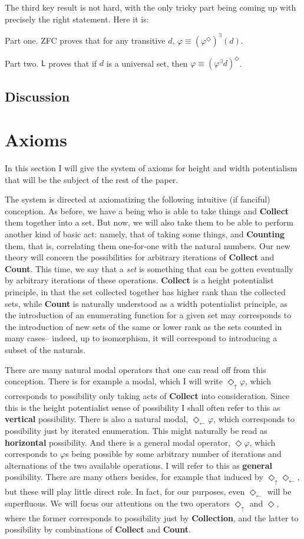 \documentclass{article}
\newcommand{\du}{\Diamond_\uparrow}
\newcommand{\dl}{\Diamond_\leftarrow}
\begin{document}
The third key result is not hard, with the only tricky part being coming up with precisely 
the right statement. Here it is:

Part one. ZFC proves that for any transitive $d$, 
$\varphi \equiv (\varphi^\Diamond)^\exists(d)$.

Part two. $\mathsf{L}$ proves that if $d$ is a universal set,
then $\varphi \equiv (\varphi^\exists d)^\Diamond$.


\subsection{Discussion}
\section{Axioms}
In this section I will give the system of axioms for height and width potentialism 
that will be the subject of the rest of the paper.

The system is directed at axiomatizing the following intuitive (if fanciful) conception.
As before, we have a being who is able to take things and {\bf Collect} them together into a set.
But now, we will also take them to be able to perform another kind of basic act: namely, 
that of taking some things, and {\bf Counting} them, that is, correlating them one-for-one
with the natural numbers. Our new theory will concern the possibilities for arbitrary iterations 
of {\bf Collect} and {\bf Count}. This time, we say that a \emph{set} is something that can be 
gotten eventually by arbitrary iterations of these operations. {\bf Collect} is a height potentialist 
principle, in that the set collected together has higher rank than the collected sets, 
while {\bf Count} is naturally understood as a width potentialist principle, 
as the introduction of an enumerating function for a given set may corresponds to the introduction 
of new sets of the same or lower rank as the sets counted in many cases--
indeed, up to isomorphism, it will correspond to introducing a subset of the naturals.

There are many natural modal operators that one can read off from this conception. 
There is for example a modal, which I will write $\du \varphi$, which corresponds to 
possibility only taking acts of {\bf Collect} into consideration. Since this is the 
height potentialist sense of possibility I shall often refer to this as {\bf vertical}
possibility. There is also a natural modal, $\dl \varphi$, which corresponds to possibility 
just by iterated enumeration. This might naturally be read as {\bf horizontal} possibility.
 And there is a general modal operator, $\Diamond \varphi$, which 
corresponds to $\varphi$s being possible by some arbitrary number of iterations and alternations 
of the two available operations. I will refer to this as {\bf general} possibility. There are 
many others besides, for example that induced by $\du\dl$, but these will play little direct role.
In fact, for our purposes, even $\dl$ will be superfluous. We will focus our attentions on 
the two operators $\du$ and $\Diamond$, where the former corresponds to possibility just by 
{\bf Collection}, and the latter to possibility by combinations of {\bf Collect} and {\bf Count}.
\end{document}

